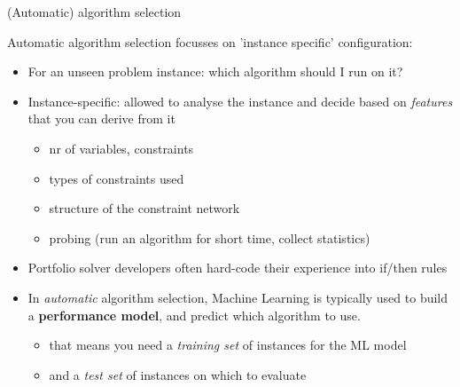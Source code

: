 \documentclass{cons-beamer}
\begin{document}
\begin{frame}{(Automatic) algorithm selection}

Automatic algorithm selection focusses on 'instance specific' configuration:

\begin{itemize}
	\item For an unseen problem instance: which algorithm should I run on it?
	\item Instance-specific: allowed to analyse the instance and decide based on \textit{features} that you can derive from it
	\begin{itemize}
		\item nr of variables, constraints
		\item types of constraints used
		\item structure of the constraint network
		\item probing (run an algorithm for short time, collect statistics)
	\end{itemize}
	\item Portfolio solver developers often hard-code their experience into if/then rules
	\pause
	
	\item In \textit{automatic} algorithm selection, Machine Learning is typically used to build a \textbf{performance model}, and predict which algorithm to use.
	\begin{itemize}
		\item that means you need a \textit{training set} of instances for the ML model
		\item and a \textit{test set} of instances on which to evaluate
	\end{itemize}
\end{itemize}
\end{frame}
\end{document}
